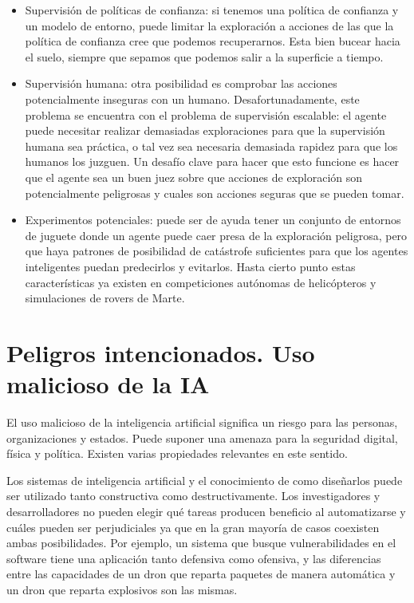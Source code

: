 \documentclass[12pt,a4paper]{article}
\begin{document}
\begin{itemize}
\item Supervisión de políticas de confianza: si tenemos una política de confianza y un modelo de entorno, puede limitar la exploración a acciones de las que la política de confianza cree que podemos recuperarnos. Esta bien bucear hacia el suelo, siempre que sepamos que podemos salir a la superficie a tiempo.

\item Supervisión humana: otra posibilidad es comprobar las acciones potencialmente inseguras con un humano. Desafortunadamente, este problema se encuentra con el problema de supervisión escalable: el agente puede necesitar realizar demasiadas exploraciones para que la supervisión humana sea práctica, o tal vez sea necesaria demasiada rapidez para que los humanos los juzguen. Un desafío clave para hacer que esto funcione es hacer que el agente sea un buen juez sobre que acciones de exploración son potencialmente peligrosas y cuales son acciones seguras que se pueden tomar.

\item Experimentos potenciales: puede ser de ayuda tener un conjunto de entornos de juguete donde un agente  puede caer presa de la exploración peligrosa, pero que haya patrones de posibilidad de catástrofe suficientes para que los agentes inteligentes puedan predecirlos y evitarlos. Hasta cierto punto estas características ya existen en competiciones autónomas de helicópteros y simulaciones de rovers de Marte.
\end{itemize}

\section{Peligros intencionados. Uso malicioso de la IA}
El uso malicioso de la inteligencia artificial significa un riesgo para las personas, organizaciones y estados. Puede suponer una amenaza para la seguridad digital, física y política. Existen varias propiedades relevantes en este sentido.

Los sistemas de inteligencia artificial y el conocimiento de como diseñarlos puede ser utilizado tanto constructiva como destructivamente. Los investigadores y desarrolladores no pueden elegir qué tareas producen beneficio al automatizarse y cuáles pueden ser perjudiciales ya que en la gran mayoría de casos coexisten ambas posibilidades. Por ejemplo, un sistema que busque vulnerabilidades en el software tiene una aplicación tanto defensiva como ofensiva, y las diferencias entre las capacidades de un dron que reparta paquetes de manera automática y un dron que reparta explosivos son las mismas.
\end{document}
